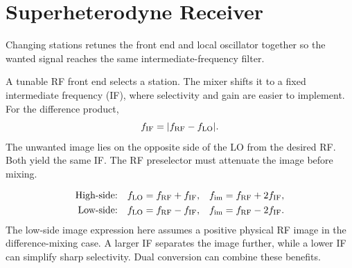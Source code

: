 \documentclass[12pt,a4paper]{article}
\begin{document}
\section{Superheterodyne Receiver}
Changing stations retunes the front end and local oscillator together so the wanted signal reaches the same intermediate-frequency filter.

\begin{tcolorbox}[defbox, title={Mix to a Fixed Intermediate Frequency}]
A tunable RF front end selects a station. The mixer shifts it to a fixed intermediate frequency (IF), where selectivity and gain are easier to implement. For the difference product,
\[
 f_{\rm IF}=|f_{\rm RF}-f_{\rm LO}|.
\]
The unwanted image lies on the opposite side of the LO from the desired RF. Both yield the same IF. The RF preselector must attenuate the image before mixing.
\end{tcolorbox}

\begin{tcolorbox}[tikzbox, unbreakable, title={Superheterodyne Receiver with RF Preselection and IF Filtering}]
\centering
{}\par
\end{tcolorbox}

\begin{tcolorbox}[formulabox, title={High-Side and Low-Side Injection}]
\[
\begin{aligned}
 \text{High-side:}\quad
 f_{\rm LO}&=f_{\rm RF}+f_{\rm IF}, & f_{\rm im}&=f_{\rm RF}+2f_{\rm IF},\\
 \text{Low-side:}\quad
 f_{\rm LO}&=f_{\rm RF}-f_{\rm IF}, & f_{\rm im}&=f_{\rm RF}-2f_{\rm IF}.
\end{aligned}
\]
The low-side image expression here assumes a positive physical RF image in the difference-mixing case. A larger IF separates the image further, while a lower IF can simplify sharp selectivity. Dual conversion can combine these benefits.
\end{tcolorbox}
\end{document}
